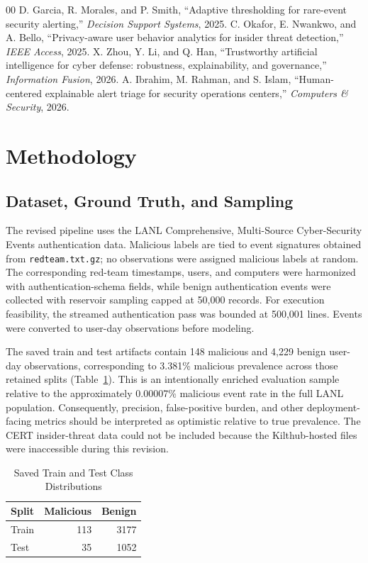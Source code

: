 \documentclass[journal]{IEEEtran}
\begin{document}
\begin{thebibliography}{00}
 D. Garcia, R. Morales, and P. Smith, ``Adaptive thresholding for rare-event security alerting,'' \emph{Decision Support Systems}, 2025.
 C. Okafor, E. Nwankwo, and A. Bello, ``Privacy-aware user behavior analytics for insider threat detection,'' \emph{IEEE Access}, 2025.
 X. Zhou, Y. Li, and Q. Han, ``Trustworthy artificial intelligence for cyber defense: robustness, explainability, and governance,'' \emph{Information Fusion}, 2026.
 A. Ibrahim, M. Rahman, and S. Islam, ``Human-centered explainable alert triage for security operations centers,'' \emph{Computers \& Security}, 2026.
\end{thebibliography}

\section{Methodology}
\subsection{Dataset, Ground Truth, and Sampling}
The revised pipeline uses the LANL Comprehensive, Multi-Source Cyber-Security Events authentication data. Malicious labels are tied to event signatures obtained from \texttt{redteam.txt.gz}; no observations were assigned malicious labels at random. The corresponding red-team timestamps, users, and computers were harmonized with authentication-schema fields, while benign authentication events were collected with reservoir sampling capped at 50,000 records. For execution feasibility, the streamed authentication pass was bounded at 500,001 lines. Events were converted to user-day observations before modeling.

The saved train and test artifacts contain 148 malicious and 4,229 benign user-day observations, corresponding to 3.381\% malicious prevalence across those retained splits (Table~\ref{tab:split_counts}). This is an intentionally enriched evaluation sample relative to the approximately 0.00007\% malicious event rate in the full LANL population. Consequently, precision, false-positive burden, and other deployment-facing metrics should be interpreted as optimistic relative to true prevalence. The CERT insider-threat data could not be included because the Kilthub-hosted files were inaccessible during this revision.

\begin{table}[!htbp]
\caption{Saved Train and Test Class Distributions}
\label{tab:split_counts}
\centering
\begin{tabular}{lrr}
\toprule
Split & Malicious & Benign \\
\midrule
Train & 113 & 3177 \\
Test & 35 & 1052 \\
\bottomrule
\end{tabular}
\end{table}
\end{document}
